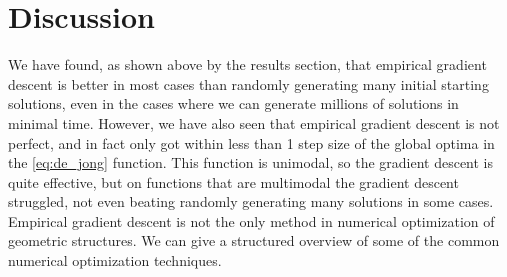 \documentclass{article}
\begin{document}
    \section{Discussion}
We have found, as shown above by the results section, that empirical gradient descent is better in most cases than randomly generating many initial starting solutions, even in the cases where we can generate millions of solutions in minimal time. However, we have also seen that empirical gradient descent is not perfect, and in fact only got within less than 1 step size of the global optima in the \ref{eq:de_jong} function. This function is unimodal, so the gradient descent is quite effective, but on functions that are multimodal the gradient descent struggled, not even beating randomly generating many solutions in some cases. Empirical gradient descent is not the only method in numerical optimization of geometric structures. We can give a structured overview of some of the common numerical optimization techniques.
\end{document}
